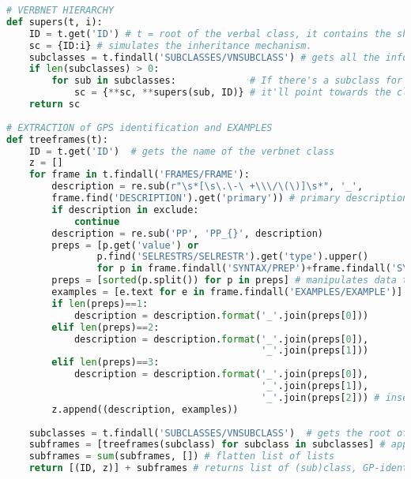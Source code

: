 \begin{lstlisting}[language=Python, caption = Importation de l'architecture des classes verbales, label=fig:archivn]
# VERBNET HIERARCHY
def supers(t, i):
    ID = t.get('ID') # t = root of the verbal class, it contains the shared syntactic information.
    sc = {ID:i} # simulates the inheritance mechanism.
    subclasses = t.findall('SUBCLASSES/VNSUBCLASS') # gets all the information on the subclasses.
    if len(subclasses) > 0:
        for sub in subclasses:             # If there's a subclass for a given VNCLASS, 
            sc = {**sc, **supers(sub, ID)} # it'll point towards the class it's being dominated by.
    return sc
		
# EXTRACTION of GPS identification and EXAMPLES
def treeframes(t):
    ID = t.get('ID')  # gets the name of the verbnet class
    z = []            
    for frame in t.findall('FRAMES/FRAME'):
        description = re.sub(r"\s*[\s\.\-\ +\\\/\(\)]\s*", '_',  
        frame.find('DESCRIPTION').get('primary')) # primary description = identification of a GP
        if description in exclude:
            continue
        description = re.sub('PP', 'PP_{}', description) 
        preps = [p.get('value') or 
                p.find('SELRESTRS/SELRESTR').get('type').upper()                  
                for p in frame.findall('SYNTAX/PREP')+frame.findall('SYNTAX/LEX')] 
        preps = [sorted(p.split()) for p in preps] # manipulates data to insert the prep. in desc.                                
        examples = [e.text for e in frame.findall('EXAMPLES/EXAMPLE')] # get ex. for each desc.
        if len(preps)==1:
            description = description.format('_'.join(preps[0]))
        elif len(preps)==2:
            description = description.format('_'.join(preps[0]),
                                             '_'.join(preps[1]))
        elif len(preps)==3:
            description = description.format('_'.join(preps[0]), 
                                             '_'.join(preps[1]), 
                                             '_'.join(preps[2])) # inserting preps in descriptions
        z.append((description, examples))
        
    subclasses = t.findall('SUBCLASSES/VNSUBCLASS')  # gets the root of each subclasses
    subframes = [treeframes(subclass) for subclass in subclasses] # applies function to subclasses
    subframes = sum(subframes, []) # flatten list of lists
    return [(ID, z)] + subframes # returns list of (sub)class, GP-identification and example
		

\end{lstlisting}
